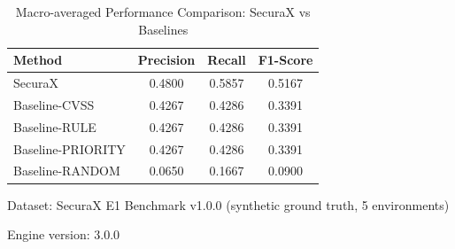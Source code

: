 \begin{table}[htbp]
\centering
\caption{Macro-averaged Performance Comparison: SecuraX vs Baselines}
\label{tab:macro_comparison}
\begin{tabular}{lccc}
\hline
\textbf{Method} & \textbf{Precision} & \textbf{Recall} & \textbf{F1-Score} \\
\hline
SecuraX & 0.4800 & 0.5857 & 0.5167 \\
Baseline-CVSS & 0.4267 & 0.4286 & 0.3391 \\
Baseline-RULE & 0.4267 & 0.4286 & 0.3391 \\
Baseline-PRIORITY & 0.4267 & 0.4286 & 0.3391 \\
Baseline-RANDOM & 0.0650 & 0.1667 & 0.0900 \\
\hline
\end{tabular}
\begin{tablenotes}
\small
\item Dataset: SecuraX E1 Benchmark v1.0.0 (synthetic ground truth, 5 environments)
\item Engine version: 3.0.0
\end{tablenotes}
\end{table}